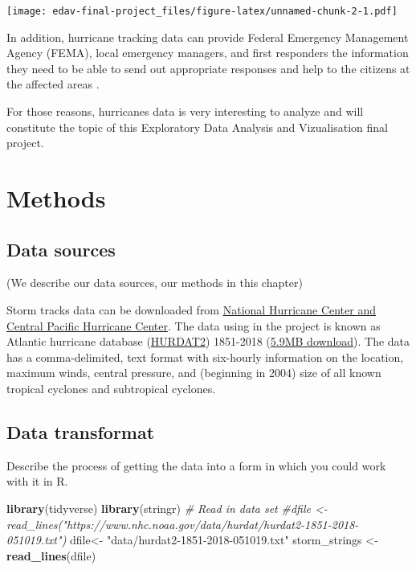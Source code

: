 \documentclass[]{book}
\newenvironment{Shaded}{\begin{snugshade}}{\end{snugshade}}
\newcommand{\CommentTok}[1]{\textcolor[rgb]{0.56,0.35,0.01}{\textit{#1}}}
\newcommand{\KeywordTok}[1]{\textcolor[rgb]{0.13,0.29,0.53}{\textbf{#1}}}
\newcommand{\NormalTok}[1]{#1}
\newcommand{\StringTok}[1]{\textcolor[rgb]{0.31,0.60,0.02}{#1}}
\begin{document}
\texttt{[image: edav-final-project\_files/figure-latex/unnamed-chunk-2-1.pdf]}

In addition, hurricane tracking data can provide Federal Emergency Management Agency (FEMA), local emergency managers, and first responders the information they need to be able to send out appropriate responses and help to the citizens at the affected areas \citep{Newtools4H2019}.

For those reasons, hurricanes data is very interesting to analyze and will constitute the topic of this Exploratory Data Analysis and Vizualisation final project.

\hypertarget{methods}{%
\chapter{Methods}\label{methods}}

\hypertarget{data-sources}{%
\section{Data sources}\label{data-sources}}

(We describe our data sources, our methods in this chapter)

Storm tracks data can be downloaded from \href{https://www.nhc.noaa.gov/data/\#hurdat}{National Hurricane Center and Central Pacific Hurricane Center}. The data using in the project is known as Atlantic hurricane database (\href{https://www.nhc.noaa.gov/data/hurdat/hurdat2-format-atlantic.pdf}{HURDAT2}) 1851-2018 (\href{https://www.nhc.noaa.gov/data/hurdat/hurdat2-1851-2018-051019.txt}{5.9MB download}). The data has a comma-delimited, text format with six-hourly information on the location, maximum winds, central pressure, and (beginning in 2004) size of all known tropical cyclones and subtropical cyclones.

\hypertarget{data-transformat}{%
\section{Data transformat}\label{data-transformat}}

Describe the process of getting the data into a form in which you could work with it in R.

\begin{Shaded}
\begin{Highlighting}[]
\KeywordTok{library}\NormalTok{(tidyverse)}
\KeywordTok{library}\NormalTok{(stringr)}
\CommentTok{# Read in data set}
\CommentTok{#dfile <- read_lines("https://www.nhc.noaa.gov/data/hurdat/hurdat2-1851-2018-051019.txt")}
\NormalTok{dfile<-}\StringTok{ "data/hurdat2-1851-2018-051019.txt"}
\NormalTok{storm_strings <-}\StringTok{ }\KeywordTok{read_lines}\NormalTok{(dfile)}
\end{Highlighting}
\end{Shaded}
\end{document}
